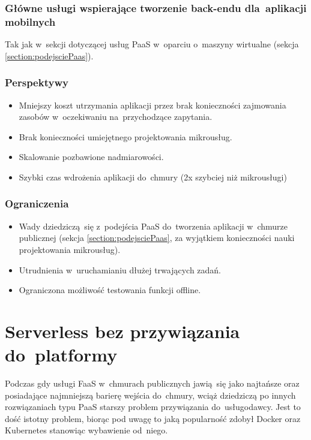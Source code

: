 \documentclass[12pt,a4paper,twoside,titlepage,openright]{book}
\begin{document}
\subsubsection{Główne usługi wspierające tworzenie back-endu dla~aplikacji mobilnych}
Tak jak w~sekcji dotyczącej usług PaaS w~oparciu o~maszyny wirtualne (sekcja \ref{section:podejsciePaas}).

\subsubsection{Perspektywy}
\begin{itemize}
\item Mniejszy koszt utrzymania aplikacji przez brak konieczności zajmowania zasobów w~oczekiwaniu na~przychodzące zapytania.
\item Brak konieczności umiejętnego projektowania mikrousług.
\item Skalowanie pozbawione nadmiarowości.
\item Szybki czas wdrożenia aplikacji do~chmury (2x szybciej niż mikrousługi) \cite{serverlessMaddie}
\end{itemize}

\subsubsection{Ograniczenia}
\begin{itemize}
\item Wady dziedziczą~się z~podejścia PaaS do~tworzenia aplikacji w~chmurze publicznej (sekcja \ref{section:podejsciePaas}, za wyjątkiem konieczności nauki projektowania mikrousług).
\item Utrudnienia w~uruchamianiu dłużej trwających zadań.
\item Ograniczona możliwość testowania funkcji offline.
\end{itemize}



\section{Serverless bez przywiązania do~platformy} 

Podczas gdy usługi FaaS w~chmurach publicznych jawią~się jako najtańsze oraz posiadające najmniejszą barierę wejścia do~chmury, wciąż dziedziczą po innych rozwiązaniach typu PaaS starszy problem przywiązania do~usługodawcy. Jest to dość istotny problem, biorąc pod uwagę to jaką popularność zdobył Docker oraz Kubernetes stanowiąc wybawienie od~niego.
\end{document}
